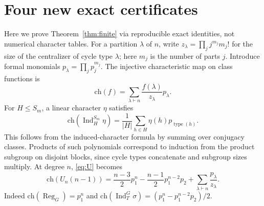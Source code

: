 \documentclass[11pt]{article}
\theoremstyle{remark}
\newcommand{\Ind}{\operatorname{Ind}}
\newcommand{\Reg}{\operatorname{Reg}}
\begin{document}
\section{Four new exact certificates}
\label{sec:cert}
Here we prove Theorem~\ref{thm:finite} via reproducible exact identities, not numerical character tables. For a partition $\lambda$ of $n$, write $z_\lambda=\prod_j j^{m_j}m_j!$ for the size of the centralizer of cycle type $\lambda$; here $m_j$ is the number of parts $j$. Introduce formal monomials $p_\lambda=\prod_j p_j^{m_j}$. The injective characteristic map on class functions is
\[ \mathrm{ch}(f)=\sum_{\lambda\vdash n}\frac{f(\lambda)}{z_\lambda}p_\lambda. \]
For $H\le S_m$, a linear character $\eta$ satisfies
\begin{equation}\label{eq:ch}
 \mathrm{ch}(\Ind_H^{S_m}\eta)=\frac1{|H|}\sum_{h\in H}\eta(h)p_{\operatorname{type}(h)}.
\end{equation}
This follows from the induced-character formula by summing over conjugacy classes. Products of such polynomials correspond to induction from the product subgroup on disjoint blocks, since cycle types concatenate and subgroup sizes multiply. At degree $n$, \eqref{eq:U} becomes
\begin{equation}\label{eq:certtarget}
 \mathrm{ch}(U_n(n-1))=\frac{n-3}{2}p_1^n-\frac{n-1}{2}p_1^{n-2}p_2
 +\sum_{\lambda\vdash n}\frac{p_\lambda}{z_\lambda}.
\end{equation}
Indeed $\mathrm{ch}(\Reg_G)=p_1^n$ and $\mathrm{ch}(\Ind_T^G\sigma)=(p_1^n-p_1^{n-2}p_2)/2$.
\end{document}
